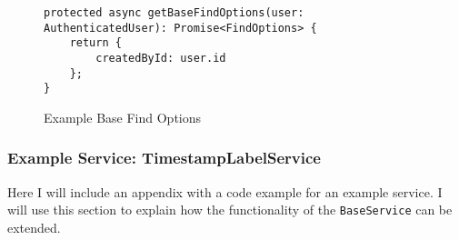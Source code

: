 \begin{figure}
    \label{fig:base-find-options}
    \begin{Verbatim}[fontsize=\footnotesize]
protected async getBaseFindOptions(user: AuthenticatedUser): Promise<FindOptions> {
    return {
        createdById: user.id
    };
}
    \end{Verbatim}
    \caption{Example Base Find Options}
\end{figure}

\subsubsection{Example Service: TimestampLabelService}
Here I will include an appendix with a code example for an example service. I will use this section to explain how the functionality of the \verb!BaseService! can be extended.